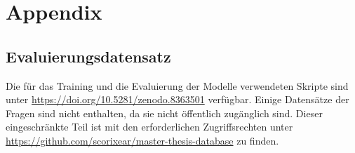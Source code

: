 \chapter*{Appendix}\label{ch:appendix}
\section*{Evaluierungsdatensatz}\label{app:evaldata}
Die für das Training und die Evaluierung der Modelle verwendeten Skripte sind unter \url{https://doi.org/10.5281/zenodo.8363501} verfügbar.
Einige Datensätze der Fragen sind nicht enthalten, da sie nicht öffentlich zugänglich sind.
Dieser eingeschränkte Teil ist mit den erforderlichen Zugriffsrechten unter \url{https://github.com/scorixear/master-thesis-database} zu finden.

